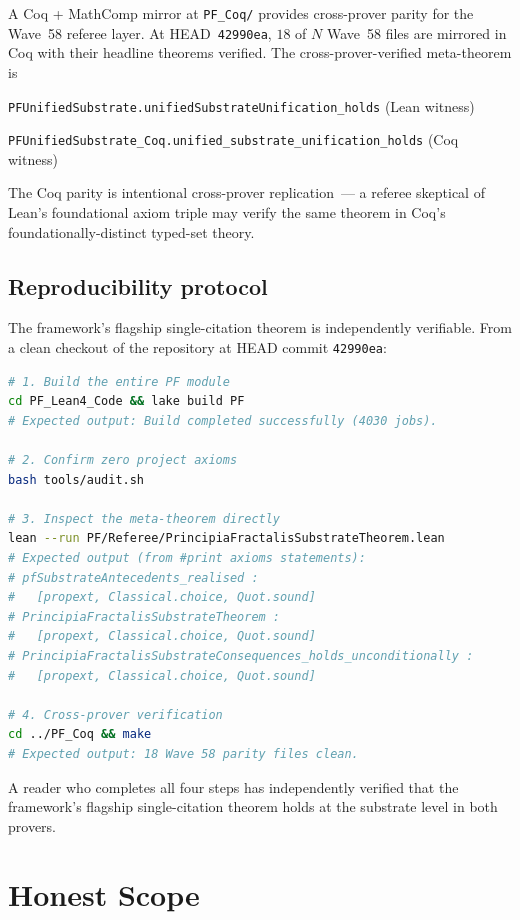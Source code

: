 \documentclass[11pt,a4paper]{article}
\theoremstyle{definition}
\theoremstyle{remark}
\newcommand{\lean}[1]{\texttt{\small #1}}
\begin{document}
A Coq + MathComp mirror at \texttt{PF\_Coq/} provides cross-prover
parity for the Wave~58 referee layer. At HEAD~\texttt{42990ea},
$18$ of $N$ Wave~58 files are mirrored in Coq with their headline
theorems verified. The cross-prover-verified meta-theorem is

\smallskip
\lean{PFUnifiedSubstrate.unifiedSubstrateUnification\_holds}
\hfill (Lean witness)

\noindent\lean{PFUnifiedSubstrate\_Coq.unified\_substrate\_unification\_holds}
\hfill (Coq witness)

\smallskip
\noindent The Coq parity is intentional cross-prover replication~---
a referee skeptical of Lean's foundational axiom triple may verify
the same theorem in Coq's foundationally-distinct typed-set theory.

\subsection{Reproducibility protocol}

The framework's flagship single-citation theorem is independently
verifiable. From a clean checkout of the repository at HEAD commit
\texttt{42990ea}:

\begin{lstlisting}[language=bash]
# 1. Build the entire PF module
cd PF_Lean4_Code && lake build PF
# Expected output: Build completed successfully (4030 jobs).

# 2. Confirm zero project axioms
bash tools/audit.sh

# 3. Inspect the meta-theorem directly
lean --run PF/Referee/PrincipiaFractalisSubstrateTheorem.lean
# Expected output (from #print axioms statements):
# pfSubstrateAntecedents_realised :
#   [propext, Classical.choice, Quot.sound]
# PrincipiaFractalisSubstrateTheorem :
#   [propext, Classical.choice, Quot.sound]
# PrincipiaFractalisSubstrateConsequences_holds_unconditionally :
#   [propext, Classical.choice, Quot.sound]

# 4. Cross-prover verification
cd ../PF_Coq && make
# Expected output: 18 Wave 58 parity files clean.
\end{lstlisting}

A reader who completes all four steps has independently verified
that the framework's flagship single-citation theorem holds at the
substrate level in both provers.

\section{Honest Scope}
\label{sec:honest-scope}
\end{document}

